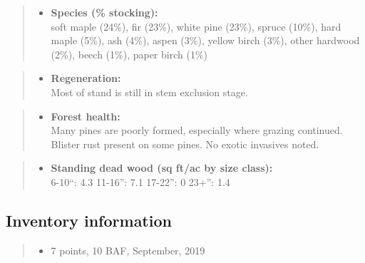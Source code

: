 \documentclass[]{tufte-handout}
\providecommand{\tightlist}{%
  \setlength{\itemsep}{0pt}\setlength{\parskip}{0pt}}
\begin{document}
\begin{quote}
\begin{itemize}
\tightlist
\item
  \textbf{Species (\% stocking):}\\
  \vspace{2pt} soft maple (24\%), fir (23\%), white pine (23\%), spruce
  (10\%), hard maple (5\%), ash (4\%), aspen (3\%), yellow birch (3\%),
  other hardwood (2\%), beech (1\%), paper birch (1\%)
\end{itemize}
\end{quote}

\begin{quote}
\begin{itemize}
\tightlist
\item
  \textbf{Regeneration:}\\
  \vspace{2pt} Most of stand is still in stem exclusion stage.
\end{itemize}
\end{quote}

\begin{quote}
\begin{itemize}
\tightlist
\item
  \textbf{Forest health:}\\
  \vspace{2pt} Many pines are poorly formed, especially where grazing
  continued. Blister rust present on some pines. No exotic invasives
  noted.
\end{itemize}
\end{quote}

\begin{quote}
\begin{itemize}
\tightlist
\item
  \textbf{Standing dead wood (sq ft/ac by size class):}\\
  \vspace{2pt} \indent \small 6-10``: 4.3 \textbar{} 11-16'': 7.1
  \textbar{} 17-22'': 0 \textbar{} 23+'': 1.4
\end{itemize}
\end{quote}

\subsection{Inventory information}\label{inventory-information-3}

\begin{quote}
\begin{itemize}
\tightlist
\item
  7 points, 10 BAF, September, 2019
\end{itemize}
\end{quote}
\end{document}
